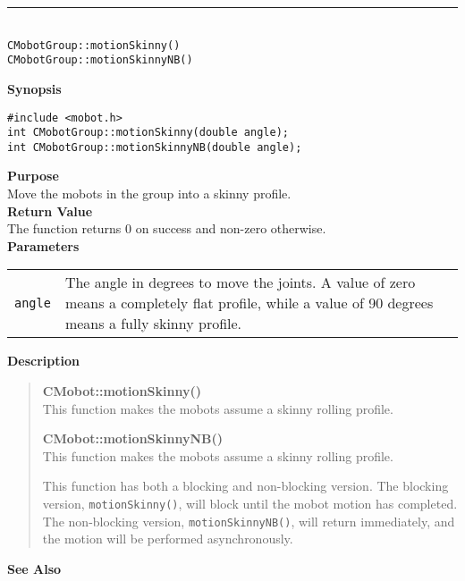 \noindent
\vspace{5pt}
\rule{4.5in}{0.015in}\\
\noindent
{\LARGE \texttt{CMobotGroup::motionSkinny()}}\\
{\LARGE \texttt{CMobotGroup::motionSkinnyNB()}}\\
{}

\noindent
{\bf Synopsis}
\vspace{-8pt}
\begin{verbatim}
#include <mobot.h>
int CMobotGroup::motionSkinny(double angle);
int CMobotGroup::motionSkinnyNB(double angle);
\end{verbatim}

\noindent
{\bf Purpose}\\
Move the mobots in the group into a skinny profile.\\

\noindent
{\bf Return Value}\\
The function returns 0 on success and non-zero otherwise.\\

\noindent
{\bf Parameters}\\
\vspace{-0.1in}
\begin{description}
\item               
\begin{tabular}{p{10 mm}p{145 mm}}
\texttt{angle} & The angle in degrees to move the joints. A value of zero means a
completely flat profile, while a value of 90 degrees means a fully skinny
profile.  \\
\end{tabular}
\end{description}


\noindent
{\bf Description}\\
\vspace{-12pt}
\begin{quote}
{\bf CMobot::motionSkinny()}\\
This function makes the mobots assume a skinny rolling profile.

{\bf CMobot::motionSkinnyNB()}\\
This function makes the mobots assume a skinny rolling profile.

This function has both a blocking and non-blocking version.
The blocking version, \texttt{motionSkinny()}, will block until the
mobot motion has completed. The non-blocking version, \texttt{motionSkinnyNB()},
will return immediately, and the motion will be performed asynchronously.\\
\end{quote}

\noindent
{\bf See Also}\\

